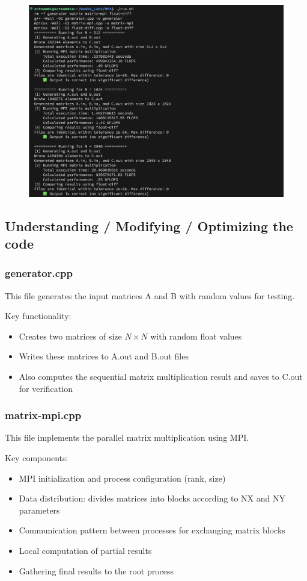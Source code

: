 \documentclass{article}
\begin{document}
\begin{figure}[htbp]
    \centering
    \includegraphics[width=1\textwidth]{./img/q2-1.png}
\end{figure}

\subsection*{Understanding / Modifying / Optimizing the code}

\subsubsection*{generator.cpp}
This file generates the input matrices A and B with random values for testing.

Key functionality:
\begin{itemize}
    \item Creates two matrices of size $N \times N$ with random float values
    \item Writes these matrices to A.out and B.out files
    \item Also computes the sequential matrix multiplication result and saves to C.out for verification
\end{itemize}

\subsubsection*{matrix-mpi.cpp}
This file implements the parallel matrix multiplication using MPI.

Key components:
\begin{itemize}
    \item MPI initialization and process configuration (rank, size)
    \item Data distribution: divides matrices into blocks according to NX and NY parameters
    \item Communication pattern between processes for exchanging matrix blocks
    \item Local computation of partial results
    \item Gathering final results to the root process
\end{itemize}
\end{document}
